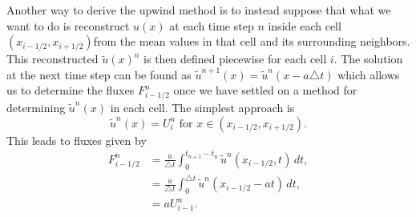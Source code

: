 Another way to derive the upwind method is to instead suppose that what we want to do is reconstruct $u(x)$ at each time step $n$ inside each cell $(x_{i-1/2},x_{i+1/2})$from the mean values in that cell and its surrounding neighbors. This reconstructed $\tilde{u}(x)^n$ is then defined piecewise for each cell $i$. The solution at the next time step can be found as $\tilde{u}^{n+1}(x) = \tilde{u}^n(x-a\triangle t)$ which allows us to determine the fluxes $F^n_{i-1/2}$ once we have settled on a method for determining $\tilde{u}^n(x)$ in each cell. The simplest approach is 
\[ \tilde{u}^n(x) = U_i^n \text{ for }x \in (x_{i-1/2},x_{i+1/2}). \]
This leads to fluxes given by 
\begin{align}
F_{i-1/2}^n &= \frac{a}{\triangle t}\int_{0}^{t_{n+1}-t_n} \tilde{u}^n(x_{i-1/2},t)\, dt , \\
&= \frac{a}{\triangle t}\int_{0}^{\triangle t} \tilde{u}^n(x_{i-1/2}-at)\, dt  ,\\
&= aU_{i-1}^n.\nonumber
\end{align}


